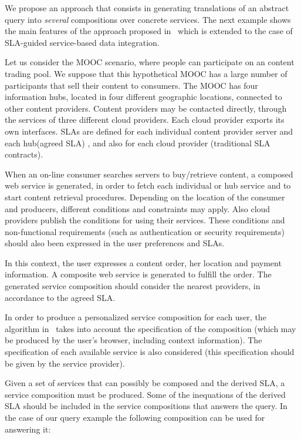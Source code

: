 We propose an approach that consists in generating translations of an abstract query into \textit{several}  compositions over concrete  services. 
The next example shows the main features of the approach proposed in~\cite{CostaAMR13} which is extended to the case of SLA-guided service-based data integration. 

Let us consider the MOOC scenario, where people can participate on an content trading pool.
We suppose that this hypothetical MOOC has a large number of participants that sell their content  to  consumers. 
The MOOC has four information hubs, located in four different geographic locations, connected to other content providers.
Content providers may be  contacted directly, through the services of three different cloud providers.
Each cloud provider exports its own interfaces.
SLAs are defined for each individual content provider server and  each hub(agreed SLA)  , and also for each cloud provider (traditional SLA contracts). 

When an on-line consumer searches servers to buy/retrieve content, a composed web service is generated, in order to fetch each individual or hub service and to start  content retrieval procedures.
Depending on the location of the consumer and producers, different conditions and constraints may apply.
Also  cloud providers  publish the conditions for using their services.
These conditions and non-functional requirements (such as authentication or security requirements) should also been expressed in the user preferences and SLAs.

In this context, the user  expresses a content order, her location and payment information. A composite web service is  generated to fulfill the order.
The generated service composition should consider the nearest providers, in accordance to the agreed SLA.

In order to produce a personalized service composition for each user, the algorithm in~\cite{CostaAMR13} takes into account the specification of the composition (which may be produced by the user's browser, including context information).
The specification of each available service is also considered (this specification should be given by the service provider).


Given a set of services that can possibly be composed and the derived SLA, a service composition must be produced.
Some of the inequations of the derived SLA should be included in the service compositions that answers the query.
In the case of our query example the following composition can be used for answering it:

